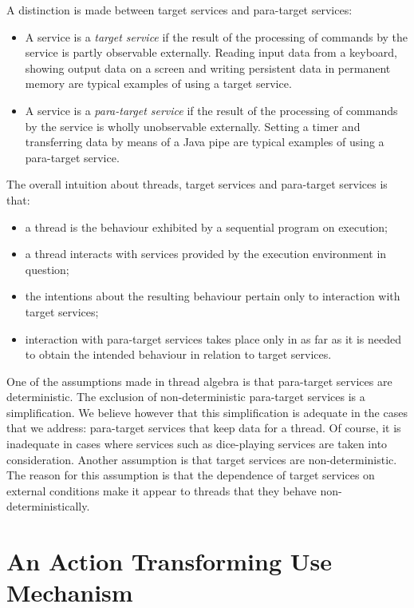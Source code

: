 \documentclass[fleqn]{llncs}
\begin{document}
A distinction is made between target services and para-target services:
\begin{itemize}
\item
A service is a \emph{target service} if the result of the processing of
commands by the service is partly observable externally.
Reading input data from a keyboard, showing output data on a screen and
writing persistent data in permanent memory are typical examples of
using a target service.
\item
A service is a \emph{para-target service} if the result of the
processing of commands by the service is wholly unobservable externally.
Setting a timer and transferring data by means of a Java pipe are
typical examples of using a para-target service.
\end{itemize}

The overall intuition about threads, target services and para-target
services is that:
\begin{itemize}
\item
a thread is the behaviour exhibited by a sequential program on
execution;
\item
a thread interacts with services provided by the execution environment
in question;
\item
the intentions about the resulting behaviour pertain only to interaction
with target services;
\item
interaction with para-target services takes place only in as far as it
is needed to obtain the intended behaviour in relation to target
services.
\end{itemize}

One of the assumptions made in thread algebra is that para-target
services are deterministic.
The exclusion of non-deterministic para-target services is a
simplification.
We believe however that this simplification is adequate in the cases
that we address: para-target services that keep data for a thread.
Of course, it is inadequate in cases where services such as dice-playing
services are taken into consideration.
Another assumption is that target services are non-deterministic.
The reason for this assumption is that the dependence of target services
on external conditions make it appear to threads that they behave
non-deterministically.

\section{An Action Transforming Use Mechanism}
\label{sect-TAtsc}
\end{document}
